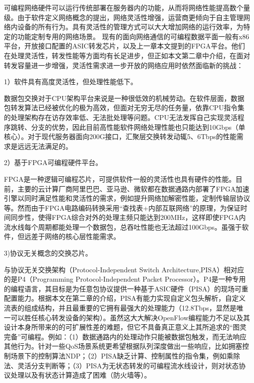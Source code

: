 





可编程网络硬件可以运行传统部署在服务器内的功能，从而将网络性能提高数个量级。由于软件定义网络概念的提出，网络灵活性增强，运营商更倾向于自主管理网络内设备的所有行为。具有灵活性的管理方式可以大大增加网络的运行效率，为特定的功能定制专用的网络场景。  现有的面向网络通信的可编程数据平面一般有x86平台，开放接口配置的ASIC转发芯片，以及上一章本文提到的FPGA平台。他们在处理灵活性，转发性能等方面均有长足进步，但正如本文第二章中介绍，在面对转发容量进一步增强，灵活性需求进一步开放的网络应用时依然面临新的挑战：

1）软件具有高度灵活性，但处理性能低下。

数据包交换对于CPU架构平台来说是一种很低效的机械劳动。在软件层面，数据包转发算法已经被优化的极为高效，但面对无穷无尽的任务量，依靠CPU指令集的处理架构存在访存效率低、无法批处理等问题。CPU无法发挥自己实现灵活程序跳转、分支的优势，因此目前高性能软件网络处理性能也只能达到10Gbps（单核心）。对于现代服务器面向200G接口，汇聚层交换转发动辄5、6Tbps的性能需求是远远无法满足的。

2）基于FPGA可编程硬件平台。

FPGA是一种逻辑可编程芯片，可提供软件一般的灵活性也具有硬件的性能。目前，主要的云计算厂商阿里巴巴、亚马逊、微软都在数据通路内部署了FPGA加速引擎以同时满足性能和灵活性的需求，例如提升网络加解密性能，定制传输层协议等。然而由于FPGA电路编码转换采用“查找表+内部互联网络”的原理，为保证时间同步性，使得FPGA综合对外的处理主频只能达到200MHz，这样即使FPGA内流水线每个周期都能处理一个数据包，总吞吐性能也无法超过100Gbps。虽强于软件，但远差于网络的核心层性能需求。

3)协议无关概念的交换芯片。

与协议无关交换架构（Protocol-Independent Switch Architecture,PISA）相对应的是P4（Programming Protocol-Independent Packet Processor）。P4是一种专用的编程语言，其目标是为任意包协议提供一种基于ASIC硬件（PISA）的现场可重配置能力。根据本文在第二章的介绍，PISA有能力实现自定义包头解析，自定义流表的组成结构，并且最重要的它拥有最强大的处理能力（12.8Tbps，显然是唯一可以胜任核心转发设备的架构）。虽然这大大解决OpenFlow编程能力不足以及其设计本身所带来的的可扩展性差的难题，但它不具备真正意义上其所追求的“图灵完备”可编程。例如：（1）数据通路内的处理动作只能被数据包触发，而无法响应其他行为。针对一些QoS场景系统更希望根据队列深度做出一些响应，比如拥塞控制场景下的控制算法NDP；（2）PISA缺乏计算、控制属性的指令集，例如乘除法、灵活分支判断等；（3）PISA为无状态转发的可编程流水线设计，则对状态协议处理以及有状态计算造成了困难（防火墙等）。

